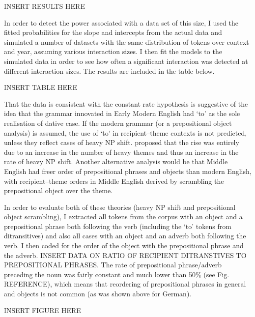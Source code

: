 \documentclass[11pt]{upenndiss}
\begin{document}
INSERT RESULTS HERE

In order to detect the power associated with a data set of this size, I used the fitted probabilities for the slope and intercepts from the actual data and simulated a number of datasets with the same distribution of tokens over context and year, assuming various interaction sizes. I then fit the models to the simulated data in order to see how often a significant interaction was detected at different interaction sizes. The results are included in the table below.

INSERT TABLE HERE

That the data is consistent with the constant rate hypothesis is suggestive of the idea that the grammar innovated in Early Modern English had `to' as the sole realisation of dative case. If the modern grammar (or a prepositional object analysis) is assumed, the use of `to' in recipient--theme contexts is not predicted, unless they reflect cases of heavy NP shift. \cite{McFadden.2002} proposed that the rise was entirely due to an increase in the number of heavy themes and thus an increase in the rate of heavy NP shift. Another alternative analysis would be that Middle English had freer order of prepositional phrases and objects than modern English, with recipient--theme orders in Middle English derived by scrambling the prepositional object over the theme.

In order to evaluate both of these theories (heavy NP shift and prepositional object scrambling), I extracted all tokens from the corpus with an object and a prepositional phrase both following the verb (including the `to' tokens from ditransitives) and also all cases with an object and an adverb both following the verb. I then coded for the order of the object with the prepositional phrase and the adverb. INSERT DATA ON RATIO OF RECIPIENT DITRANSTIVES TO PREPOSITIONAL PHRASES. The rate of prepositional phrase/adverb preceding the noun was fairly constant and much lower than 50\% (see Fig. REFERENCE), which means that reordering of prepositional phrases in general and objects is not common (as was shown above for German).

INSERT FIGURE HERE
\end{document}
